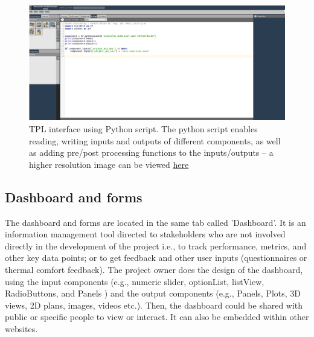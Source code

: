\documentclass{scsSimAUDPaperFormat}
\begin{document}
\begin{figure}[h]
\centering
\includegraphics[width=\columnwidth]{imgs/tpl_interface.png}
\caption{TPL interface using Python script. The python script enables reading, writing inputs and outputs of different components, as well as adding pre/post processing functions to the inputs/outputs -- a higher resolution image can be viewed \href{https://raw.githubusercontent.com/ideas-lab-nus/paper-SIMAUD2020-three-tier-architecture-platform/master/paper_LateX/imgs/tpl_interface.png}{here}}
\label{fig:tpl_interface}
\end{figure}
\subsection{Dashboard and forms}

\label{sec:applicationlayer}
The dashboard and forms are located in the same tab called 'Dashboard'. It is an information management tool directed to stakeholders who are not involved directly in the development of the project i.e., to track performance, metrics, and other key data points; or to get feedback and other user inputs (questionnaires or thermal comfort feedback). The project owner does the design of the dashboard, using the input components (e.g., numeric slider, optionList, listView, RadioButtons, and  Panels ) and the output components (e.g., Panels, Plots, 3D views, 2D plans, images, videos etc.). Then, the dashboard could be shared with public or specific people to view or interact. It can also be embedded within other websites.
\end{document}
